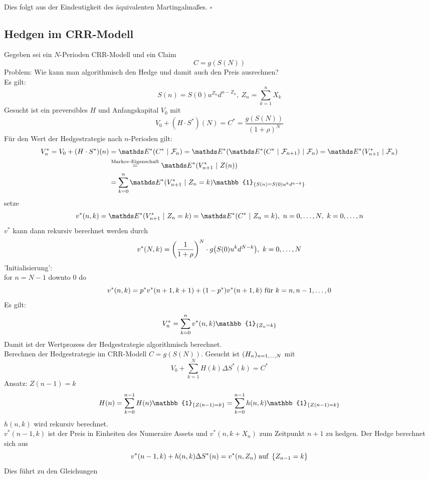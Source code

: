 \\
Dies folgt aus der Eindeutigkeit des äquivalenten Martingalmaßes.
\hfill $\square$

\subsection{Hedgen im CRR-Modell}
\label{sub:hedgen_im_crr-modell}
Gegeben sei ein $N$-Perioden CRR-Modell und ein Claim
\[
C=g(S(N))
\]
Problem: Wie kann man algorithmisch den Hedge und damit auch den Preis ausrechnen?\\
Es gilt:
\[
S(n)=S(0)u^{Z_n}d^{n-Z_n},~Z_n=\sum_{k=1}^{n}X_k
\]
Gesucht ist ein preversibles $H$ und Anfangskapital $V_0$ mit
\[
V_0+(H\cdot S^*)(N)=C^*=\frac{g(S(N))}{(1+\rho)^N}
\]
Für den Wert der Hedgestrategie nach $n$-Perioden gilt:
\begin{equation*}
\begin{aligned}
V_n^*=V_0+(H\cdot S^*)(n) &= \E^*(C^*~|~\F_n) = \E^*(\E^*(C^*~|~\F_{n+1})~|~\F_n) = \E^*(V_{n+1}^*~|~\F_n)\\
&\stackrel{\text{Markov-Eigenschaft}}{=} \E^*(V_{n+1}^*~|~Z(n))\\
&= \sum_{k=0}^{n}\E^*(V_{n+1}^*~|~Z_n=k)\mathbb{1}_{\penbrace{S(n)=S(0)u^kd^{n-k}}}
\end{aligned}
\end{equation*}
setze
\[
v^*(n,k)=\E^*(V_{n+1}^*~|~Z_n=k)=\E^*(C^*~|~Z_n=k),~ n=0\dt{,}N,~k=0\dt{,}n
\]
$v^*$ kann dann rekursiv berechnet werden durch
\[
v^*(N,k)=\left( \frac{1}{1+\rho}\right)^N\cdot g\big(S(0)u^kd^{N-k}\big),~k=0, \dots ,N
\]
'Initialisierung':\\
for $n=N-1$ downto 0 do
\[
v^*(n,k)= p^*v^*(n+1,k+1)+(1-p^*)v^*(n+1,k) \text{ für } k=n,n-1, \dots ,0
\]
Es gilt:
\[
V_n^*=\sum_{k=0}^{n}v^*(n,k)\mathbb{1}_{\penbrace{Z_n=k}}
\]
Damit ist der Wertprozess der Hedgestrategie algorithmisch berechnet.\\
Berechnen der Hedgestrategie im CRR-Modell $C=g(S(N))$.
Gesucht ist $(H_n)_{n=1, \dots ,N}$ mit
\[
V_0+\sum_{k=1}^{N}H(k)\Delta S^*(k)=C^*
\]
Ansatz: $Z(n-1)=k$\\
\[
H(n)=\sum_{k=0}^{n-1}H(n)\mathbb{1}_{\penbrace{Z(n-1)=k}}=\sum_{k=0}^{n-1}h(n,k)\mathbb{1}_{\penbrace{Z(n-1)=k}}
\]
$h(n,k)$ wird rekursiv berechnet.\\
$v^*(n-1,k)$ ist der Preis in Einheiten des Numeraire Assets und $v^*(n,k+X_n)$ zum Zeitpunkt $n+1$ zu hedgen.
Der Hedge berechnet sich aus
\[
v^*(n-1,k)+h(n,k)\Delta S^*(n)=v^*(n,Z_n)\text{ auf }\left\{Z_{n-1}=k\right\}
\]
Dies führt zu den Gleichungen

